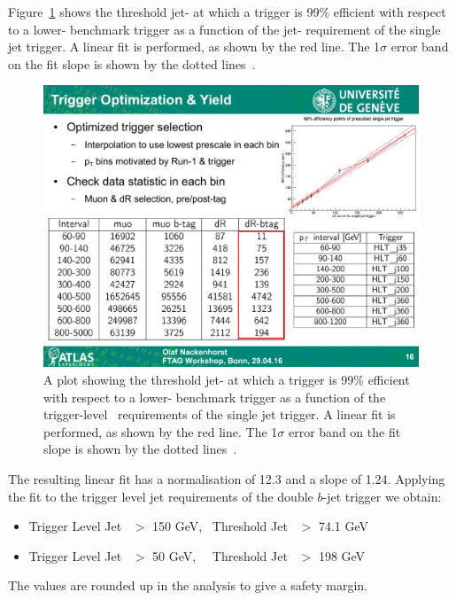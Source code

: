 Figure~\ref{fig:triggerTurnOn_fit} shows the threshold jet-\pT{} 
at which a trigger is 99\% efficient with respect to a lower-\pT{} benchmark trigger
as a function of the jet-\pT{} requirement of the single jet trigger.
A linear fit is performed, as shown by the red line.
The 1$\sigma$ error band on the fit slope is shown by the dotted lines~\cite{evt-jet_turnOnFit}.

\begin{figure}[!hbt]
    \begin{center}
        \includegraphics[width=0.7\linewidth, angle=0]{figs/Dibjet/LowMass/jetTriggerTurnOn.pdf}
      \end{center}
  \caption[A plot showing the threshold jet-\pT{} at which a trigger is 99\% efficient
             with respect to a lower-\pT{} benchmark trigger as a function of the trigger-level~\pT{} requirements of the single jet trigger.
             A linear fit is performed, as shown by the red line. The 1$\sigma$ error band on the fit slope is shown by the dotted lines.]
           {A plot showing the threshold jet-\pT{} at which a trigger is 99\% efficient
             with respect to a lower-\pT{} benchmark trigger as a function of the trigger-level~\pT{} requirements of the single jet trigger.
             A linear fit is performed, as shown by the red line. The 1$\sigma$ error band on the fit slope is shown by the dotted lines~\cite{evt-jet_turnOnFit}.}
          \label{fig:triggerTurnOn_fit}
\end{figure}

\noindent
The resulting linear fit has a normalisation of 12.3 and a slope of 1.24.
Applying the fit to the trigger level jet requirements of the double $b$-jet trigger we obtain:
\vspace{-0.5em}
\begin{itemize}[leftmargin=*]
\item Trigger Level Jet~\pT{} $>$ 150 GeV,~  Threshold Jet~\pT{} $>$ 74.1 GeV 
\item Trigger Level Jet~\pT{} $>$  50 GeV,~~ Threshold Jet~\pT{} $>$ 198 GeV
\end{itemize}
\vspace{-0.3em}
\noindent
The values are rounded up in the analysis to give a safety margin.


